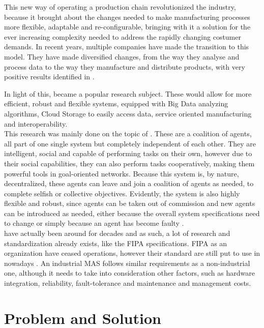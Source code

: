 This new way of operating a production chain revolutionized the industry, because it brought about the changes needed to make manufacturing processes more flexible, adaptable and re-configurable, bringing with it a solution for the ever increasing complexity needed to address the rapidly changing costumer demands.
In recent years, multiple companies have made the transition to this model. They have made diversified changes, from the way they analyse and process data to the way they manufacture and distribute products, with very positive results identified in \cite{rit01}.

In light of this,  became a popular research subject. These  would allow for more efficient, robust and flexible systems, equipped with Big Data analyzing algorithms, Cloud Storage to easily access data, service oriented manufacturing and interoperability.\\

This research was mainly done on the topic of  \cite{sakurada01} \cite{karnouskos01}. These  are a coalition of agents, all part of one single system but completely independent of each other. They are intelligent, social and capable of performing tasks on their own, however due to their social capabilities, they can also perform tasks cooperatively, making them powerful tools in goal-oriented networks. Because this system is, by nature, decentralized, these agents can leave and join a coalition of agents as needed, to complete selfish or collective objectives. Evidently, the system is also highly flexible and robust, since agents can be taken out of commission and new agents can be introduced as needed, either because the overall system specifications need to change or simply because an agent has become faulty \cite{paulo02}.\\

 have actually been around for decades and as such, a lot of research and standardization already exists, like the \gls{FIPA} specifications. \gls{FIPA} as an organization have ceased operations, however their standard are still put to use in  nowadays \cite{FIPA_website}. An industrial \acrshort{MAS} follows similar requirements as a non-industrial one, although it needs to take into consideration other factors, such as hardware integration, reliability, fault-tolerance and maintenance and management costs.

\section{Problem and Solution}
\label{sec:problem_and_solution}

